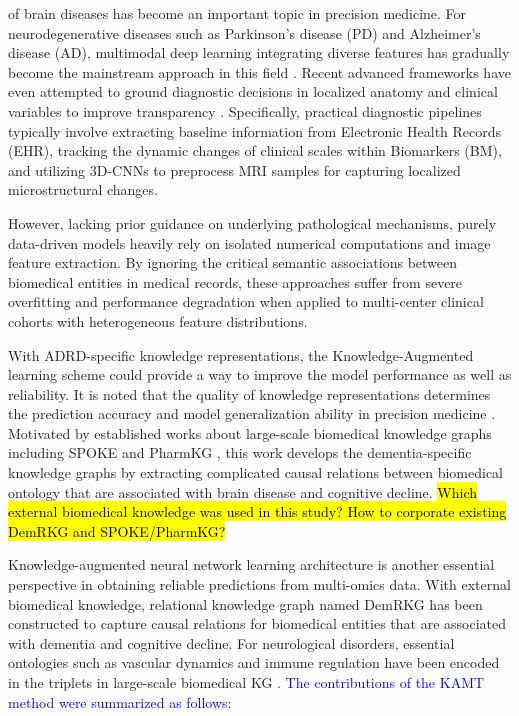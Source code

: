 \documentclass[lettersize,journal]{IEEEtran}
\begin{document}
     of brain diseases has become an important topic in precision medicine. For neurodegenerative diseases such as Parkinson's disease (PD) and Alzheimer's disease (AD), multimodal deep learning integrating diverse features has gradually become the mainstream approach in this field \cite{qiu2022multimodal,zhang2026multimodalpd}. Recent advanced frameworks have even attempted to ground diagnostic decisions in localized anatomy and clinical variables to improve transparency \cite{lin2025adlip,wood2026align}. Specifically, practical diagnostic pipelines typically involve extracting baseline information from Electronic Health Records (EHR)\cite{rajkomar2018scalable}, tracking the dynamic changes of clinical scales within Biomarkers (BM)\cite{marek2011parkinson}, and utilizing 3D-CNNs \cite{basaia2019automated} to preprocess MRI samples for capturing localized microstructural changes.

    However, lacking prior guidance on underlying pathological mechanisms, purely data-driven models heavily rely on isolated numerical computations and image feature extraction. By ignoring the critical semantic associations between biomedical entities in medical records, these approaches suffer from severe overfitting and performance degradation\cite{lu2021knowledge} when applied to multi-center clinical cohorts with heterogeneous feature distributions.

    
    With ADRD-specific knowledge representations, the Knowledge-Augmented learning scheme could provide a way to improve the model performance as well as reliability. It is noted that the quality of knowledge representations determines the prediction accuracy and model generalization ability in precision medicine \cite{chandak2023building}. Motivated by established works about large-scale biomedical knowledge graphs including SPOKE \cite{morris2023spoke} and PharmKG \cite{zheng2021pharmkg}, this work develops the dementia-specific knowledge graphs by extracting complicated causal relations between biomedical ontology that are associated with brain disease and cognitive decline.
    \hl{Which external biomedical knowledge was used in this study? How to corporate existing DemRKG and SPOKE/PharmKG?}
    
    Knowledge-augmented neural network learning architecture is another essential perspective in obtaining reliable predictions from multi-omics data. With external biomedical knowledge, relational knowledge graph named DemRKG has been constructed to capture causal relations for biomedical entities that are associated with dementia and cognitive decline. For neurological disorders, essential ontologies such as vascular dynamics and immune regulation have been encoded in the triplets in large-scale biomedical KG \cite{zhao2026kgt,sim2024gtad}. \textcolor{blue}{The contributions of the KAMT method were summarized as follows:}
    
\end{document}
